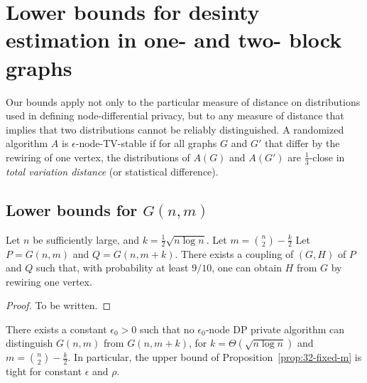 
\section{Lower bounds for desinty estimation in one- and two- block graphs}
\label{sec:lower}

\begin{remark} Our bounds apply not only to the particular measure of
  distance on distributions used in defining node-differential
  privacy, but to any measure of distance that implies that two
  distributions cannot be reliably distinguished. A randomized
  algorithm $A$ is $\epsilon$-node-TV-stable if for all graphs $G$ and
  $G'$ that differ by the rewiring of one vertex, the distributions of
  $A(G)$ and $A(G')$ are $\tfrac 1 3$-close in \emph{total variation
    distance} (or statistical difference). 
\end{remark}

\subsection{Lower bounds for $G(n,m)$} \label{sec:lower-one-block}

\begin{proposition}
  Let $n$ be sufficiently large, and $k = \tfrac 1 2 \sqrt{n \log n}$. Let $m = {\binom n 2} - \frac k 2$
  Let $P = G(n,m)$ and $Q = G(n,m +k )$.   
  There exists a coupling of $(G,H)$ of $P$ and $Q$ such that, with probability at least $9/10$, one can obtain $H$ from $G$ by rewiring one vertex.  
\end{proposition}

\begin{proof}
  To be written.
\end{proof}

\begin{theorem}
  There exists a constant $\epsilon_0>0$ such that no
  $\epsilon_0$-node DP private algorithm can distinguish $G(n,m)$ from
  $G(n,m +k )$, for $k = \Theta(\sqrt{n \log n})$ and $m = \binom n 2
  - \tfrac k 2$. In particular, the upper bound of
  Proposition~\ref{prop:32-fixed-m} is tight for constant $\epsilon$
  and $\rho$. 
\end{theorem}


